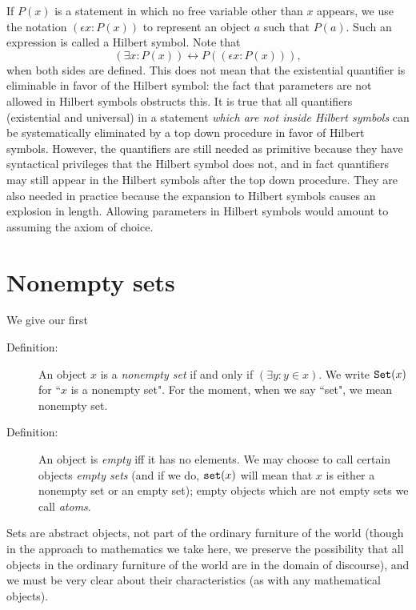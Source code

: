 \documentclass[12pt]{article}
\begin{document}
If $P(x)$ is a statement in which no free variable other than $x$ appears, we use the notation $(\epsilon x:P(x))$ to represent an object $a$ such that $P(a)$.  Such an expression is called a Hilbert symbol.  Note that $$(\exists x:P(x)) \leftrightarrow P((\epsilon x:P(x))),$$  when both sides are defined.  This does not mean that the existential quantifier is eliminable in favor of the Hilbert symbol:  the fact that parameters are not allowed in Hilbert symbols obstructs this.  It is true that all quantifiers (existential and universal) in a statement {\em which are not inside Hilbert symbols\/} can be systematically eliminated by a top down procedure in favor of Hilbert symbols.  However, the quantifiers are still needed as primitive because they have syntactical privileges that the Hilbert symbol does not, and in fact quantifiers may still appear in the Hilbert symbols after the top down procedure. They are also needed in practice because the expansion to Hilbert symbols causes an explosion in length.  Allowing parameters in Hilbert symbols would amount to assuming the axiom of choice.
\newpage

\section{Nonempty sets}

We give our first

\begin{description}

\item[Definition:]  An object $x$ is a {\em nonempty set\/} if and only if $(\exists y:y \in x)$.  We write ${\tt Set}(x)$ for ``$x$ is a nonempty set".  For the moment, when we say ``set",  we mean nonempty set.

\item[Definition:]  An object is {\em empty\/} iff it has no elements.  We may choose to call certain objects {\em empty sets\/} (and if we do, ${\tt set}(x)$ will mean that $x$ is either a nonempty set or an empty set);  empty objects which are not empty sets we call {\em atoms\/}.

\end{description}

Sets are abstract objects, not part of the ordinary furniture of the world (though in the approach to mathematics we take here, we preserve the possibility that all objects in the ordinary furniture of the world are in the domain of discourse), and we must be very clear about their characteristics (as with any mathematical objects).
\end{document}
